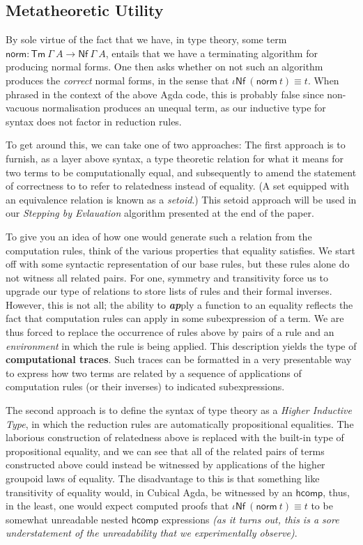 \subsection{Metatheoretic Utility}

By sole virtue of the fact that we have, in type theory, some term
$\mathsf{norm} : \mathsf{Tm}~\Gamma~A \to \mathsf{Nf}~\Gamma~A$, entails that we
have a terminating algorithm for producing normal forms. One then asks whether
on not such an algorithm produces the \emph{correct} normal forms, in the sense
that $\iota\mathsf{Nf}~(\mathsf{norm}~t) \equiv t$. When phrased in the context
of the above Agda code, this is probably false since non-vacuous normalisation
produces an unequal term, as our inductive type for syntax does not factor in
reduction rules.

To get around this, we can take one of two approaches: The first approach is to
furnish, as a layer above syntax, a type theoretic relation for what it means
for two terms to be computationally equal, and subsequently to amend the
statement of correctness to to refer to relatedness instead of equality. (A set
equipped with an equivalence relation is known as a \emph{setoid}.) This setoid
approach will be used in our \emph{Stepping by Evlauation} algorithm presented
at the end of the paper.

To give you an idea of how one would generate such a relation from the
computation rules, think of the various properties that equality satisfies. We
start off with some syntactic representation of our base rules, but these rules
alone do not witness all related pairs. For one, symmetry and transitivity force
us to upgrade our type of relations to store lists of rules and their formal
inverses. However, this is not all; the ability to \emph{\textbf{ap}}ply a
function to an equality reflects the fact that computation rules can apply in
some subexpression of a term. We are thus forced to replace the occurrence of
rules above by pairs of a rule and an \emph{environment} in which the rule is
being applied. This description yields the type of \textbf{computational
traces}. Such traces can be formatted in a very presentable way to express how
two terms are related by a sequence of applications of computation rules (or
their inverses) to indicated subexpressions.

The second approach is to define the syntax of type theory as a \emph{Higher
Inductive Type}, in which the reduction rules are automatically propositional
equalities. The laborious construction of relatedness above is replaced with
the built-in type of propositional equality, and we can see that all of the
related pairs of terms constructed above could instead be witnessed by
applications of the higher groupoid laws of equality. The disadvantage to this
is that something like transitivity of equality would, in Cubical Agda, be
witnessed by an $\mathsf{hcomp}$, thus, in the least, one would expect computed
proofs that $\iota\mathsf{Nf}~(\mathsf{norm}~t) \equiv t$ to be somewhat
unreadable nested $\mathsf{hcomp}$ expressions \emph{(as it turns out, this is
a sore understatement of the unreadability that we experimentally observe)}.

